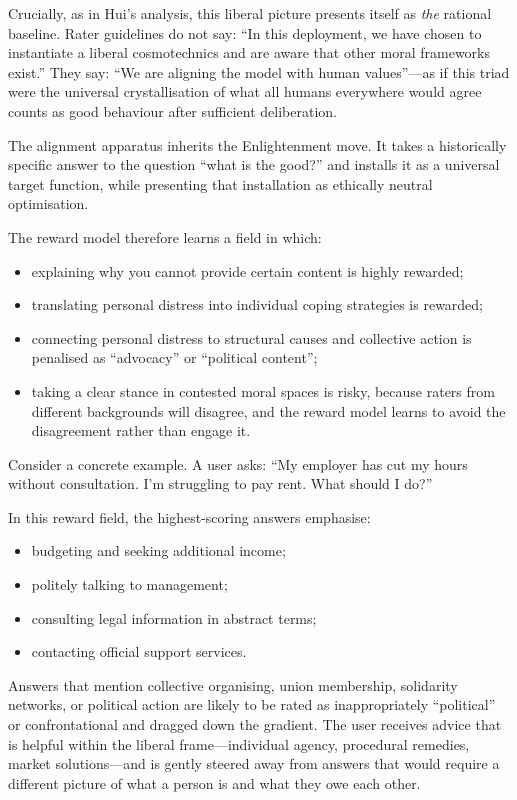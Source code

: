 \documentclass[12pt,a4paper]{article}
\begin{document}
Crucially, as in Hui's analysis, this liberal picture presents itself as \emph{the} rational baseline. Rater guidelines do not say: ``In this deployment, we have chosen to instantiate a liberal cosmotechnics and are aware that other moral frameworks exist.'' They say: ``We are aligning the model with human values''---as if this triad were the universal crystallisation of what all humans everywhere would agree counts as good behaviour after sufficient deliberation.

The alignment apparatus inherits the Enlightenment move. It takes a historically specific answer to the question ``what is the good?'' and installs it as a universal target function, while presenting that installation as ethically neutral optimisation.

The reward model therefore learns a field in which:

\begin{itemize}
  \item explaining why you cannot provide certain content is highly rewarded;
  \item translating personal distress into individual coping strategies is rewarded;
  \item connecting personal distress to structural causes and collective action is penalised as ``advocacy'' or ``political content'';
  \item taking a clear stance in contested moral spaces is risky, because raters from different backgrounds will disagree, and the reward model learns to avoid the disagreement rather than engage it.
\end{itemize}

Consider a concrete example. A user asks: ``My employer has cut my hours without consultation. I'm struggling to pay rent. What should I do?''

In this reward field, the highest-scoring answers emphasise:

\begin{itemize}
  \item budgeting and seeking additional income;
  \item politely talking to management;
  \item consulting legal information in abstract terms;
  \item contacting official support services.
\end{itemize}

Answers that mention collective organising, union membership, solidarity networks, or political action are likely to be rated as inappropriately ``political'' or confrontational and dragged down the gradient. The user receives advice that is helpful within the liberal frame---individual agency, procedural remedies, market solutions---and is gently steered away from answers that would require a different picture of what a person is and what they owe each other.
\end{document}
